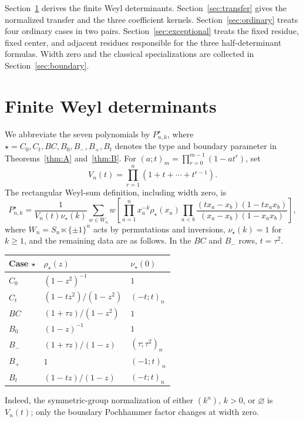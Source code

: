 \documentclass[12pt]{article}
\numberwithin{equation}{section}
\begin{document}
Section~\ref{sec:finite} derives the finite Weyl determinants.
Section~\ref{sec:transfer} gives the normalized transfer and the three
coefficient kernels.  Section~\ref{sec:ordinary} treats four ordinary
cases in two pairs.  Section~\ref{sec:exceptional} treats the fixed
residue, fixed center, and adjacent residues responsible for the three
half-determinant formulas.  Width zero and the classical specializations
are collected in Section~\ref{sec:boundary}.


\section{Finite Weyl determinants}\label{sec:finite}

We abbreviate the seven polynomials by $P^\star_{n,k}$, where
$\star=C_0,C_t,BC,B_0,B_-,B_+,B_t$ denotes the type and boundary
parameter in Theorems~\ref{thm:A} and~\ref{thm:B}.
For $(a;t)_m=\prod_{r=0}^{m-1}(1-at^r)$, set
\[
 V_n(t)=\prod_{r=1}^n(1+t+\cdots+t^{r-1}).
\]
The rectangular Weyl-sum definition, including width zero, is
\begin{equation}\label{eq:weyl}
 P^\star_{n,k}
 =\frac{1}{V_n(t)\nu_\star(k)}
 \sum_{w\in W_n}w\left[
 \prod_{a=1}^n x_a^{-k}\rho_\star(x_a)
 \prod_{a<b}\frac{(tx_a-x_b)(1-tx_ax_b)}
                    {(x_a-x_b)(1-x_ax_b)}\right],
\end{equation}
where $W_n=S_n\ltimes\{\pm1\}^n$ acts by permutations and inversions,
$\nu_\star(k)=1$ for $k\ge1$, and the remaining data are as follows.
In the $BC$ and $B_-$ rows, $t=\tau^2$.
\begin{center}
\renewcommand{\arraystretch}{1.35}
\begin{tabular}{@{}lll@{}}
\toprule
Case $\star$ & $\rho_\star(z)$ & $\nu_\star(0)$\\
\midrule
$C_0$ & $(1-z^2)^{-1}$ & $1$\\
$C_t$ & $(1-tz^2)/(1-z^2)$ & $(-t;t)_n$\\
$BC$ & $(1+\tau z)/(1-z^2)$ & $1$\\
$B_0$ & $(1-z)^{-1}$ & $1$\\
$B_-$ & $(1+\tau z)/(1-z)$ & $(\tau;\tau^2)_n$\\
$B_+$ & $1$ & $(-1;t)_n$\\
$B_t$ & $(1-tz)/(1-z)$ & $(-t;t)_n$\\
\bottomrule
\end{tabular}
\end{center}
Indeed, the symmetric-group normalization of either $(k^n)$, $k>0$,
or $\varnothing$ is $V_n(t)$; only the boundary Pochhammer factor
changes at width zero.
\end{document}
